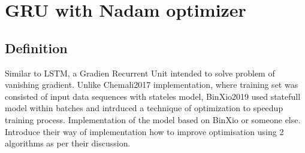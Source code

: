 \section{GRU with Nadam optimizer}\label{sec:GRU-nadam}
\subsection{Definition}
    Similar to LSTM, a Gradien Recurrent Unit intended to solve problem of vanishing gradient.
    Unlike Chemali2017 implementation, where training set was consisted of input data sequences with stateles model, BinXio2019 used statefull model within batches and intrduced a technique of optimization to speedup training process.
Implementation of the model based on BinXio or someone else. Introduce their way of implementation how to improve optimisation using 2 algorithms as per their discussion.